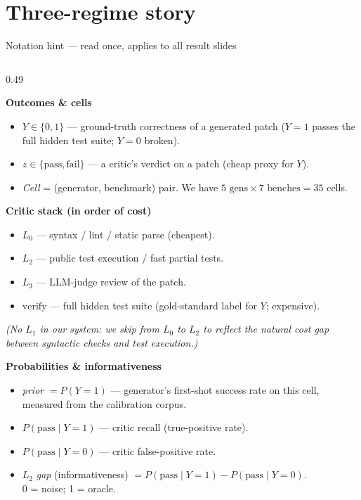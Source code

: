 \documentclass[10pt]{beamer}
\newcommand{\info}[1]{\textcolor{primaryBlue}{\textbf{#1}}}
\begin{document}

\section{Three-regime story}
\hypertarget{out:11}{}

\begin{frame}{Notation hint --- read once, applies to all result slides}
\vspace{-0.1cm}
\scriptsize

\begin{columns}[T,onlytextwidth]

\begin{column}{0.49\textwidth}

\info{Outcomes \& cells}
\begin{itemize}\setlength{\itemsep}{1pt}
\item $Y \in \{0,1\}$ --- ground-truth correctness of a generated patch
($Y{=}1$ passes the full hidden test suite; $Y{=}0$ broken).
\item $z \in \{\text{pass},\text{fail}\}$ --- a critic's verdict on a patch
(cheap proxy for $Y$).
\item \emph{Cell} = (generator, benchmark) pair. We have
$5\text{ gens} \times 7\text{ benches} = 35$ cells.
\end{itemize}

\vspace{4pt}
\info{Critic stack (in order of cost)}
\begin{itemize}\setlength{\itemsep}{1pt}
\item $L_0$ --- syntax / lint / static parse (cheapest).
\item $L_2$ --- public test execution / fast partial tests.
\item $L_3$ --- LLM-judge review of the patch.
\item $\mathrm{verify}$ --- full hidden test suite (gold-standard label
for $Y$; expensive).
\end{itemize}
{\tiny\itshape (No $L_1$ in our system: we skip from $L_0$ to $L_2$ to
reflect the natural cost gap between syntactic checks and test
execution.)}

\vspace{4pt}
\info{Probabilities \& informativeness}
\begin{itemize}\setlength{\itemsep}{1pt}
\item \emph{prior} $= P(Y{=}1)$ --- generator's first-shot success rate
on this cell, measured from the calibration corpus.
\item $P(\mathrm{pass}\mid Y{=}1)$ --- critic recall (true-positive rate).
\item $P(\mathrm{pass}\mid Y{=}0)$ --- critic false-positive rate.
\item $L_2$ \emph{gap} (informativeness)
$= P(\mathrm{pass}\mid Y{=}1) - P(\mathrm{pass}\mid Y{=}0)$. \\
0 = noise; 1 = oracle.
\end{itemize}


\end{column}
\end{columns}
\end{frame}
\end{document}

